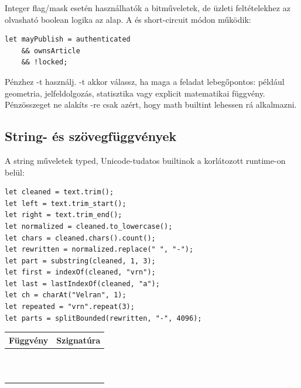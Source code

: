 Integer flag/mask esetén használhatók a bitműveletek, de üzleti feltételekhez az olvasható boolean logika az alap. A \code{&&} és \code{||} short-circuit módon működik:

\begin{lstlisting}[language=Velran]
let mayPublish = authenticated
    && ownsArticle
    && !locked;
\end{lstlisting}

Pénzhez -t használj. -t akkor válassz, ha maga a feladat lebegőpontos: például geometria, jelfeldolgozás, statisztika vagy explicit matematikai függvény. Pénzösszeget ne alakíts -re csak azért, hogy math builtint lehessen rá alkalmazni.

\subsection*{String- és szövegfüggvények}

A string műveletek typed, Unicode-tudatos builtinok a korlátozott runtime-on belül:

\begin{lstlisting}[language=Velran]
let cleaned = text.trim();
let left = text.trim_start();
let right = text.trim_end();
let normalized = cleaned.to_lowercase();
let chars = cleaned.chars().count();
let rewritten = normalized.replace(" ", "-");
let part = substring(cleaned, 1, 3);
let first = indexOf(cleaned, "vrn");
let last = lastIndexOf(cleaned, "a");
let ch = charAt("Velran", 1);
let repeated = "vrn".repeat(3);
let parts = splitBounded(rewritten, "-", 4096);
\end{lstlisting}

\begin{center}
\begin{tabularx}{\textwidth}{@{}Y Y@{}}
\toprule
\textbf{Függvény} & \textbf{Szignatúra} \\
\midrule
{} &  \\
 &  \\
 &  \\
 &  \\
 &  \\
 &  \\
 &  \\
 &  \\
 &  \\
 &  \\
 &  \\
\bottomrule
\end{tabularx}
\end{center}

